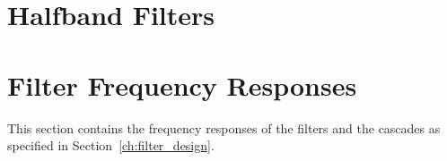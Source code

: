 \section{Halfband Filters} %
\label{sec:halfband_filters}



\section{Filter Frequency Responses} %
\label{sec:filter_frequency_responses}

This section contains the frequency responses  of the filters and the cascades
as specified in Section~\ref{ch:filter_design}.

\subsection{} %
\label{sec:filter_frequency_responses:5steep}

\subsection{} %
\label{sec:filter_frequency_responses:5flat}

\subsection{} %
\label{sec:filter_frequency_responses:2steep}

\subsection{} %
\label{sec:filter_frequency_responses:cic25}

